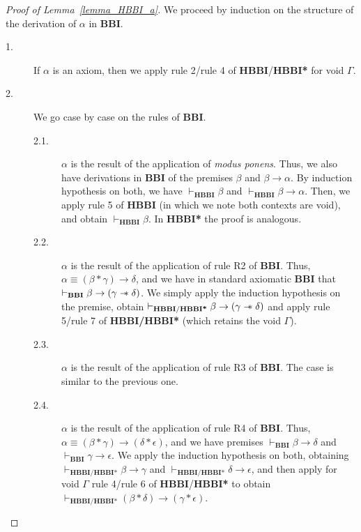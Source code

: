 \documentclass[a4paper]{article}
\newcommand\magicwand{\mathrel{-\mkern-6mu*}}
\newcommand{\BBI}{\textbf{BBI}\xspace}
\begin{document}
\begin{proof}[Proof of Lemma~\ref{lemma_HBBI_a}]
    We proceed by induction on the structure of the derivation of $\alpha$ in \BBI.
 \begin{description}
        \item[1.] If $\alpha$ is an axiom, then we apply rule 2/rule 4 of \textbf{HBBI}/\textbf{HBBI*} for void $\Gamma$.

        \item[2.] We go case by case on the rules of \BBI.

\begin{description}

\item[2.1.] $\alpha$ is the result of the application of \textit{modus ponens}. Thus, we also have derivations in \BBI of the premises $\beta$ and $\beta \rightarrow \alpha$. By induction hypothesis on both, we have $\vdash_{\textbf{HBBI}} \beta$ and $\vdash_{\textbf{HBBI}} \beta \rightarrow \alpha$. Then, we apply rule 5 of \textbf{HBBI} (in which we note both contexts are void), and obtain $\vdash_{\textbf{HBBI}} \beta$. In \textbf{HBBI*} the proof is analogous.

\item[2.2.] $\alpha$ is the result of the application of rule R2 of \BBI. Thus, $\alpha \equiv (\beta * \gamma) \rightarrow \delta$, and we have in standard axiomatic \BBI that $\vdash_{\BBI}\beta \rightarrow (\gamma \magicwand \delta)$. We simply apply the induction hypothesis on the premise, obtain $\vdash_{\textbf{HBBI}/\textbf{HBBI*}} \beta \rightarrow (\gamma \magicwand \delta)$ and apply rule 5/rule 7 of \textbf{HBBI/HBBI*} (which retains the void $\Gamma$).

\item[2.3.] $\alpha$ is the result of the application of rule R3 of \BBI. The case is similar to the previous one.

\item[2.4.] $\alpha$ is the result of the application of rule R4 of \BBI. Thus, $\alpha \equiv (\beta * \gamma) \rightarrow (\delta * \epsilon)$, and we have premises $\vdash_{\BBI}\beta \rightarrow \delta$ and $\vdash_{\BBI}\gamma \rightarrow \epsilon$. We apply the induction hypothesis on both, obtaining $\vdash_{\textbf{HBBI}/\textbf{HBBI*}} \beta \rightarrow \gamma$ and $\vdash_{\textbf{HBBI}/\textbf{HBBI*}} \delta \rightarrow \epsilon$, and then apply for void $\Gamma$ rule 4/rule 6 of \textbf{HBBI}/\textbf{HBBI*} to obtain $\vdash_{\textbf{HBBI}/\textbf{HBBI*}} (\beta * \delta) \rightarrow (\gamma * \epsilon)$.

\end{description}
\end{description}
\end{proof}
\end{document}
